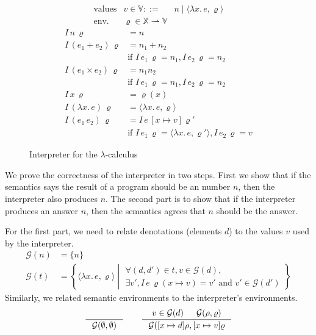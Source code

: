 \documentclass{tufte-handout}
\newcommand{\LAM}[1]{\lambda #1.\,}
\newcommand{\pto}[0]{\rightharpoonup}
\newcommand{\VAR}[0]{\mathbb{X}}
\newcommand{\ext}[3]{#3(#1{\mapsto}#2)}
\begin{document}
\begin{figure}
\[
\begin{array}{lrl}
 \text{values} & v \in \mathbb{V} ::= & n \mid \langle \LAM{x}e, \varrho \rangle \\
 \text{env.} & \varrho \in \VAR \pto \mathbb{V} 
\end{array}
\]
\begin{align*}
  I\,n\,\varrho &= n \\
  I\,(e_1 + e_2)\,\varrho &= n_1 + n_2 \\
      & \text{if } I\,e_1\,\varrho = n_1, I\,e_2\,\varrho = n_2 \\
  I\,(e_1 \times e_2)\,\varrho &= n_1 n_2 \\
      & \text{if } I\,e_1\,\varrho = n_1, I\,e_2\,\varrho = n_2 \\
  I\,x\,\varrho &= \varrho(x) \\
  I\,(\LAM{x}e)\,\varrho &= \langle \LAM{x}e, \varrho \rangle \\
  I\,(e_1\,e_2)\,\varrho &=  I\,e\,[x\mapsto v]\varrho'\\
  & \text{if } I\,e_1\,\varrho = \langle \LAM{x}e,\varrho' \rangle,
      I\,e_2\,\varrho = v
\end{align*}

\caption{Interpreter for the $\lambda$-calculus}
\label{fig:interp-lambda}
\end{figure}

We prove the correctness of the interpreter in two steps.  First we
show that if the semantics says the result of a program should be an
number $n$, then the interpreter also produces $n$. The second part is
to show that if the interpreter produces an answer $n$, then the
semantics agrees that $n$ should be the answer.

For the first part, we need to relate denotations (elements $d$) to
the values $v$ used by the interpreter.
\begin{align*}
  \mathcal{G}(n) &= \{ n \} \\
  \mathcal{G}(t) &= \left\{ \langle \LAM{x} e, \varrho \rangle \middle|
     \begin{array}{l}
       \forall (d,d') \in t, v \in \mathcal{G}(d),\\
       \exists v', I\,e\,\ext{x}{v}{\varrho} = v'
               \text{ and } v'\in\mathcal{G}(d')
     \end{array} \right\}
\end{align*}
Similarly, we related semantic environments to the
interpreter's environments.
\[
  \inference{}{\mathcal{G}(\emptyset,\emptyset)}
  \qquad
  \inference{v \in \mathcal{G}(d) & \mathcal{G}(\rho,\varrho)}
            {\mathcal{G}([x\mapsto d] \rho, [x\mapsto v] \varrho}
\]
\end{document}
